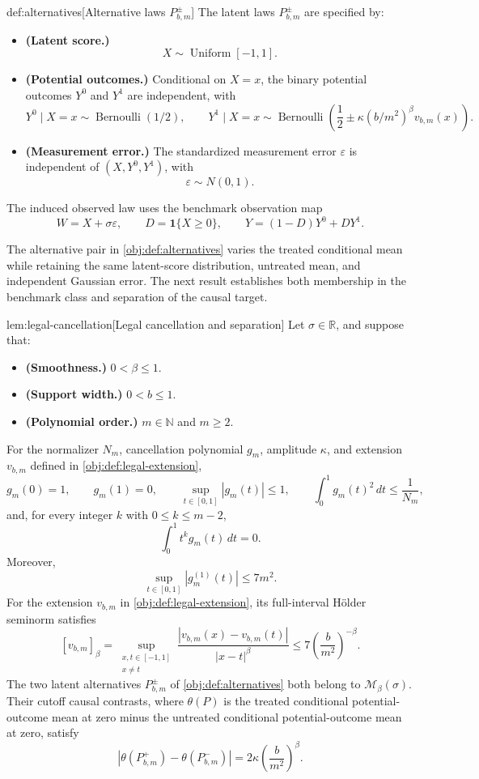 \documentclass[11pt]{article}
\begin{document}
\begin{definitionv}{def:alternatives}[Alternative laws \(P^\pm_{b,m}\)]
The latent laws \(P^\pm_{b,m}\) are specified by:
\begin{itemize}
\item \textbf{(Latent score.)}
\[
X\sim\operatorname{Uniform}[-1,1].
\]
\item \textbf{(Potential outcomes.)} Conditional on \(X=x\), the binary potential outcomes \(Y^0\) and \(Y^1\) are independent, with
\[
Y^0\mid X=x\sim\operatorname{Bernoulli}(1/2),
\qquad
Y^1\mid X=x\sim
\operatorname{Bernoulli}\!\left(
\frac12\pm\kappa(b/m^2)^\beta v_{b,m}(x)
\right).
\]
\item \textbf{(Measurement error.)} The standardized measurement error \(\varepsilon\) is independent of \((X,Y^0,Y^1)\), with
\[
\varepsilon\sim N(0,1).
\]
\end{itemize}
The induced observed law uses the benchmark observation map
\[
W=X+\sigma\varepsilon,\qquad
D=\mathbf1\{X\ge0\},\qquad
Y=(1-D)Y^0+DY^1.
\]
\end{definitionv}

The alternative pair  in \cref{obj:def:alternatives} varies the treated conditional mean while retaining the same latent-score distribution, untreated mean, and independent Gaussian error. The next result establishes both membership in the benchmark class and separation of the causal target.

\begin{lemmav}{lem:legal-cancellation}[Legal cancellation and separation]
Let \(\sigma\in\mathbb R\), and suppose that:
\begin{itemize}
\item \textbf{(Smoothness.)} \(0<\beta\le1\).
\item \textbf{(Support width.)} \(0<b\le1\).
\item \textbf{(Polynomial order.)} \(m\in\mathbb N\) and \(m\ge2\).
\end{itemize}
For the normalizer \(N_m\), cancellation polynomial \(g_m\), amplitude \(\kappa\), and extension \(v_{b,m}\) defined in \cref{obj:def:legal-extension},
\[
g_m(0)=1,\qquad g_m(1)=0,\qquad
\sup_{t\in[0,1]}|g_m(t)|\le1,\qquad
\int_0^1g_m(t)^2\,dt\le\frac1{N_m},
\]
and, for every integer \(k\) with \(0\le k\le m-2\),
\[
\int_0^1t^kg_m(t)\,dt=0.
\]
Moreover,
\[
\sup_{t\in[0,1]}|g_m^{(1)}(t)|\le7m^2.
\]
For the extension \(v_{b,m}\) in \cref{obj:def:legal-extension}, its full-interval Hölder seminorm satisfies
\[
[v_{b,m}]_\beta
=
\sup_{\substack{x,t\in[-1,1]\\x\ne t}}
\frac{|v_{b,m}(x)-v_{b,m}(t)|}{|x-t|^\beta}
\le7\left(\frac{b}{m^2}\right)^{-\beta}.
\]
The two latent alternatives \(P^\pm_{b,m}\) of \cref{obj:def:alternatives} both belong to \(\mathcal M_\beta(\sigma)\). Their cutoff causal contrasts, where \(\theta(P)\) is the treated conditional potential-outcome mean at zero minus the untreated conditional potential-outcome mean at zero, satisfy
\[
\left|\theta(P^+_{b,m})-\theta(P^-_{b,m})\right|
=
2\kappa\left(\frac{b}{m^2}\right)^\beta.
\]
\end{lemmav}
\end{document}
